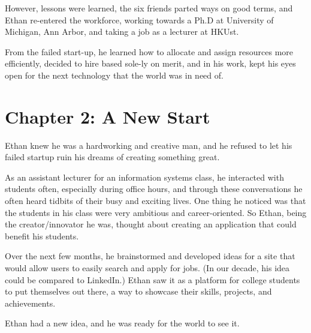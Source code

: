 \documentclass[a4paper,12pt,twoside]{book}
\begin{document}
However, lessons were learned, the six friends parted ways on good terms, and Ethan re-entered the workforce, working towards a Ph.D at University of Michigan, Ann Arbor, and taking a job as a lecturer at HKUst.

From the failed start-up, he learned how to allocate and assign resources more efficiently, decided to hire based sole-ly on merit, and in his work, kept his eyes open for the next technology that the world was in need of.


\chapter{Chapter 2: A New Start}

Ethan knew he was a hardworking and creative man, and he refused to let his failed startup ruin his dreams of creating something great. 

As an assistant lecturer for an information systems class, he interacted with students often, especially during office hours, and through these conversations he often heard tidbits of their busy and exciting lives. One thing he noticed was that the students in his class were very ambitious and career-oriented. So Ethan, being the creator/innovator he was, thought about creating an application that could benefit his students. 

Over the next few months, he brainstormed and developed ideas for a site that would allow users to easily search and apply for jobs. (In our decade, his idea could be compared to LinkedIn.) Ethan saw it as a platform for college students to put themselves out there, a way to showcase their skills, projects, and achievements. 

Ethan had a new idea, and he was ready for the world to see it. 
 
\end{document}
